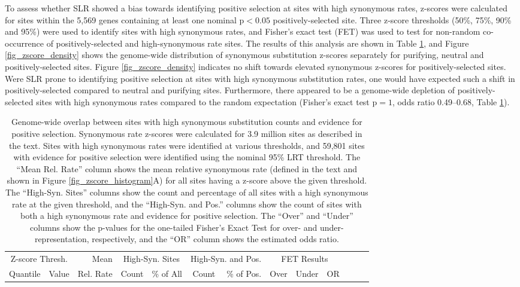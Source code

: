 To assess whether SLR showed a bias towards identifying positive
selection at sites with high synonymous rates, z-scores were
calculated for sites within the 5,569 genes containing at least one
nominal p$<0.05$ positively-selected site. Three z-score thresholds
(50\%, 75\%, 90\% and 95\%) were used to identify sites with high
synonymous rates, and Fisher's exact test (FET) was used to test for
non-random co-occurrence of positively-selected and high-synonymous
rate sites. The results of this analysis are shown in Table
\ref{table_zscore_tests}, and Figure \ref{fig_zscore_density} shows the
genome-wide distribution of synonymous substitution z-scores
separately for purifying, neutral and positively-selected sites.
Figure \ref{fig_zscore_density} indicates no shift towards elevated
synonymous z-scores for positively-selected sites. Were SLR prone to
identifying positive selection at sites with high synonymous
substitution rates, one would have expected such a shift in
positively-selected compared to neutral and purifying
sites. Furthermore, there appeared to be a genome-wide depletion of
positively-selected sites with high synonymous rates compared to the
random expectation (Fisher's exact test p$=1$, odds ratio 0.49--0.68,
Table \ref{table_zscore_tests}).

\begin{table}
\centering \footnotesize
\begin{tabular}{rrrrrrrrrrrrr}
\toprule
 \multicolumn{2}{c}{Z-score Thresh.} & Mean & \multicolumn{2}{c}{High-Syn. Sites} & \multicolumn{2}{c}{High-Syn. and Pos.} & \multicolumn{3}{c}{FET Results} \\
\cmidrule(r){1-2} \cmidrule(r){4-5} \cmidrule(r){6-7} \cmidrule(r){8-10}
Quantile & Value & Rel. Rate & Count & \% of All & Count & \% of Pos. & Over & Under & OR \\
  \midrule

\bottomrule
\end{tabular}
\caption{Genome-wide overlap between sites with high synonymous
  substitution counts and evidence for positive selection. Synonymous
  rate z-scores were calculated for 3.9 million sites as described in
  the text. Sites with high synonymous rates were identified at
  various thresholds, and 59,801 sites with evidence for positive
  selection were identified using the nominal 95\% LRT threshold. The
  ``Mean Rel. Rate'' column shows the mean relative synonymous rate
  (defined in the text and shown in Figure
  \ref{fig_zscore_histogram}A) for all sites having a z-score above
  the given threshold. The ``High-Syn. Sites'' columns show the count
  and percentage of all sites with a high synonymous rate at the given
  threshold, and the ``High-Syn. and Pos.''  columns show the count of
  sites with both a high synonymous rate and evidence for positive
  selection. The ``Over'' and ``Under'' columns show the p-values for the
  one-tailed Fisher's Exact Test for over- and under-representation,
  respectively, and the ``OR'' column shows the estimated odds ratio.}
\label{table_zscore_tests}
\end{table}


